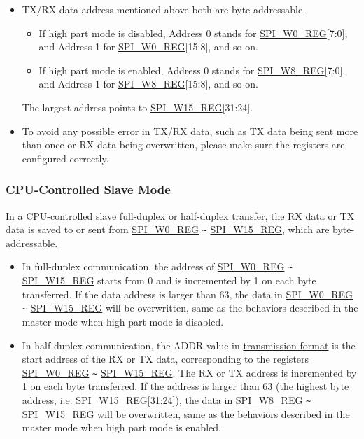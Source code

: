 \documentclass[main\_\_EN.tex]{subfiles}
\begin{document}
\begin{tiplisting}
\vspace{-2em}
\begin{itemize}
    \item TX/RX data address mentioned above both are byte-addressable.
    \begin{itemize}
        \item If high part mode is disabled, Address 0 stands for \hyperref[regdesc:SPIW0REG]{SPI\_W0\_REG}[7:0], and Address 1 for \hyperref[regdesc:SPIW0REG]{SPI\_W0\_REG}[15:8], and so on.
        \item If high part mode is enabled, Address 0 stands for \hyperref[regdesc:SPIW0REG]{SPI\_W8\_REG}[7:0], and Address 1 for \hyperref[regdesc:SPIW0REG]{SPI\_W8\_REG}[15:8], and so on.
    \end{itemize}
    The largest address points to \hyperref[regdesc:SPIW15REG]{SPI\_W15\_REG}[31:24].
    \item To avoid any possible error in TX/RX data, such as TX data being sent more than once or RX data being overwritten, please make sure the registers are configured correctly.
\end{itemize}
\end{tiplisting}

\subsubsection{CPU-Controlled Slave Mode} \label{GP-SPI2 slave CPU}

In a CPU-controlled slave full-duplex or half-duplex transfer, the RX data or TX data is saved to or sent from \hyperref[regdesc:SPIW0REG]{SPI\_W0\_REG} \verb+~+ \hyperref[regdesc:SPIW15REG]{SPI\_W15\_REG}, which are byte-addressable.

\begin{itemize}
    \item In full-duplex communication, the address of \hyperref[regdesc:SPIW0REG]{SPI\_W0\_REG} \verb+~+ \hyperref[regdesc:SPIW15REG]{SPI\_W15\_REG} starts from 0 and is incremented by 1 on each byte transferred. If the data address is larger than 63, the data in \hyperref[regdesc:SPIW0REG]{SPI\_W0\_REG} \verb+~+ \hyperref[regdesc:SPIW15REG]{SPI\_W15\_REG} will be overwritten, same as the behaviors described in the master mode when high part mode is disabled.
    \item In half-duplex communication, the ADDR value in \hyperref[slave communication format]{transmission format} is the start address of the RX or TX data, corresponding to the registers \hyperref[regdesc:SPIW0REG]{SPI\_W0\_REG} \verb+~+ \hyperref[regdesc:SPIW15REG]{SPI\_W15\_REG}. The RX or TX address is incremented by 1 on each byte transferred. If the address is larger than 63 (the highest byte address, i.e. \hyperref[regdesc:SPIW15REG]{SPI\_W15\_REG}[31:24]), the data in \hyperref[regdesc:SPIW8REG]{SPI\_W8\_REG} \verb+~+ \hyperref[regdesc:SPIW15REG]{SPI\_W15\_REG} will be overwritten, same as the behaviors described in the master mode when high part mode is enabled.
\end{itemize}
\end{document}

